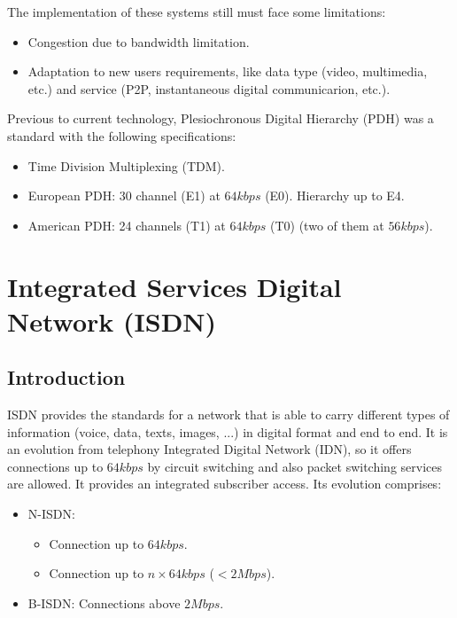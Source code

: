 \documentclass[
	12pt,
	twoside
]{book}
\begin{document}
The implementation of these systems still must face some limitations:

\begin{itemize}
	\item Congestion due to bandwidth limitation.
	\item Adaptation to new users requirements, like data type (video, multimedia, etc.) and service (P2P, instantaneous digital communicarion, etc.).
\end{itemize}

Previous to current technology, Plesiochronous Digital Hierarchy (PDH) was a standard with the following specifications:

\begin{itemize}
	\item Time Division Multiplexing (TDM).
	\item European PDH: 30 channel (E1) at $64 kbps$ (E0). Hierarchy up to E4.
	\item American PDH: 24 channels (T1) at $64 kbps$ (T0) (two of them at $56 kbps$).
\end{itemize}

\section{Integrated Services Digital Network (ISDN)}

\subsection{Introduction}

ISDN provides the standards for a network that is able to carry different types of information (voice, data, texts, images, ...) in digital format and end to end. It is an evolution from telephony Integrated Digital Network (IDN), so it offers connections up to $64 kbps$ by circuit switching and also packet switching services are allowed. It provides an integrated subscriber access. Its evolution comprises:

\begin{itemize}
	\item {
		N-ISDN:
		\begin{itemize}
			\item Connection up to $64 kbps$.
			\item Connection up to $n \times 64 kbps$ ($< 2 Mbps$).
		\end{itemize}
	}
	\item B-ISDN: Connections above $2 Mbps$.
\end{itemize}
\end{document}
